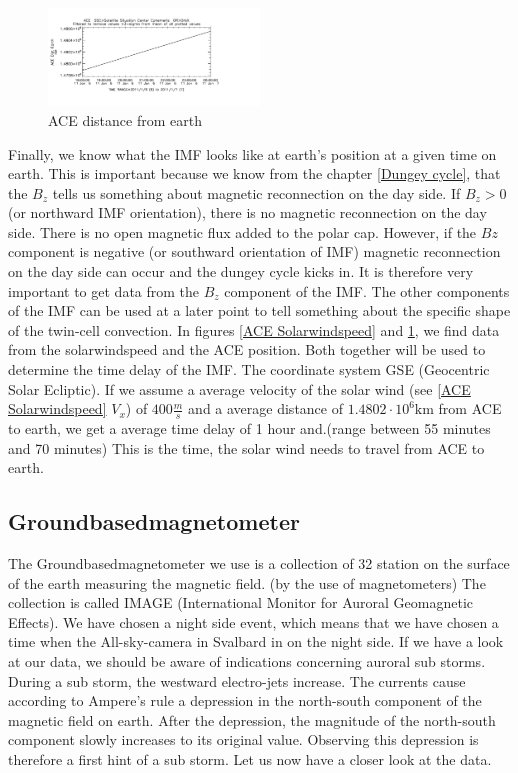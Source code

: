 \documentclass[10pt,a4paper]{article}
\begin{document}
\begin{figure}[h]
\centering
\includegraphics[width=0.5\textwidth]{ACE_distance.pdf}
\caption{ ACE distance from earth \label{ACE distance}}
\end{figure}
Finally, we know what the IMF looks like at earth's position at a given time on earth. 
This is important because we know from the chapter \ref{Dungey cycle}, that the $B_z$ tells us something about magnetic reconnection on the day side. If $B_z>0$ (or northward IMF orientation), there is no magnetic reconnection on the day side. There is no open magnetic flux added to the polar cap. 
However, if the $Bz$ component is negative (or southward orientation of IMF) magnetic reconnection on the day side can occur and the dungey cycle kicks in. 
It is therefore very important to get data from the $B_z$ component of the IMF. The other components of the IMF can be used at a later point to tell something about the specific shape of the twin-cell convection. In figures \ref{ACE Solarwindspeed} and \ref{ACE distance}, we find data from the solarwindspeed and the ACE position. Both together will be used to determine the time delay of the IMF. The coordinate system GSE (Geocentric Solar Ecliptic). If we assume a average velocity of the solar wind (see \ref{ACE Solarwindspeed} $V_x$) of $400 \frac{m}{s}$ and a average distance of $1.4802 \cdot 10^{6} \mathrm{km}$ from ACE to earth, we get a average time delay of 1 hour and.(range between 55 minutes and 70 minutes) This is the time, the solar wind needs to travel from ACE to earth. 


\clearpage
\subsection{Groundbasedmagnetometer}

The Groundbasedmagnetometer we use is a collection of 32 station on the surface of the earth measuring the magnetic field. (by the use of magnetometers) 
The collection is called IMAGE (International Monitor for Auroral Geomagnetic Effects). We have chosen a night side event, which means that we have chosen a time when the All-sky-camera in Svalbard in on the night side. 
If we have a look at our data, we should be aware of indications concerning auroral sub storms. During a sub storm, the westward electro-jets increase. The currents cause according to Ampere's rule a depression in the north-south component of the magnetic field on earth. After the depression, the magnitude of the north-south component slowly increases to its original value.
Observing this depression is therefore a first hint of a sub storm. 
Let us now have a closer look at the data. 
\end{document}
